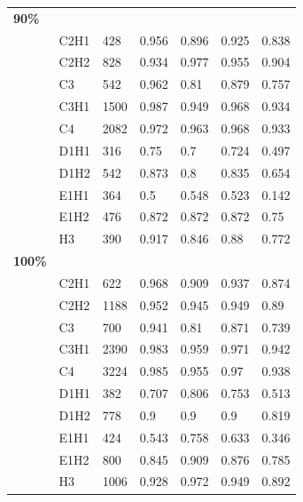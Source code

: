 \begin{table}
\begin{center}
\begin{tabular}{lllllll}
{\bfseries 90\%} & \\
& C2H1 &  428  &  0.956 &  0.896 &  0.925 &  0.838 \\
& C2H2 &  828  &  0.934 &  0.977 &  0.955 &  0.904 \\
& C3   &  542  &  0.962 &  0.81  &  0.879 &  0.757 \\
& C3H1 &  1500 &  0.987 &  0.949 &  0.968 &  0.934 \\
& C4   &  2082 &  0.972 &  0.963 &  0.968 &  0.933 \\
& D1H1 &  316  &  0.75  &  0.7   &  0.724 &  0.497 \\
& D1H2 &  542  &  0.873 &  0.8   &  0.835 &  0.654 \\
& E1H1 &  364  &  0.5   &  0.548 &  0.523 &  0.142 \\
& E1H2 &  476  &  0.872 &  0.872 &  0.872 &  0.75  \\
& H3   &  390  &  0.917 &  0.846 &  0.88  &  0.772 \\  \hline

{\bfseries 100\%} & \\
& C2H1 &  622  &  0.968 &  0.909 &  0.937 &  0.874 \\
& C2H2 &  1188 &  0.952 &  0.945 &  0.949 &  0.89  \\
& C3   &  700  &  0.941 &  0.81  &  0.871 &  0.739 \\
& C3H1 &  2390 &  0.983 &  0.959 &  0.971 &  0.942 \\
& C4   &  3224 &  0.985 &  0.955 &  0.97  &  0.938 \\
& D1H1 &  382  &  0.707 &  0.806 &  0.753 &  0.513 \\
& D1H2 &  778  &  0.9   &  0.9   &  0.9   &  0.819 \\
& E1H1 &  424  &  0.543 &  0.758 &  0.633 &  0.346 \\
& E1H2 &  800  &  0.845 &  0.909 &  0.876 &  0.785 \\
& H3   &  1006 &  0.928 &  0.972 &  0.949 &  0.892 \\  \hline

\end{tabular}
\end{center}
\end{table}

